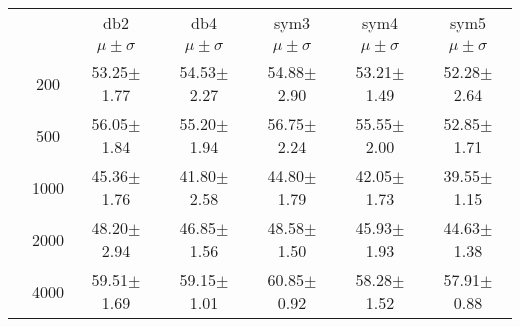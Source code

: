 \begin{table}[H]
\begin{tabular}{|c|c|c c c c c|}
\multicolumn{2}{c|}{}  & db2 & db4 & sym3 & sym4 & sym5 \\\cline{3-7}
\multicolumn{2}{c|}{}& $\mu \pm \sigma$ & $\mu \pm \sigma$ & $\mu \pm \sigma$ & $\mu \pm \sigma$ & $\mu \pm \sigma$ \\\hline

\multicolumn{1}{|c|}{ \multirow{5}{*}{\rotatebox[origin=c]{90}{\textbf{Neurônios}}} }
&200	&53.25$\pm$1.77	&54.53$\pm$2.27	&54.88$\pm$2.90	&53.21$\pm$1.49	&52.28$\pm$2.64\\\cline{2-7}
&500	&56.05$\pm$1.84	&55.20$\pm$1.94	&56.75$\pm$2.24	&55.55$\pm$2.00	&52.85$\pm$1.71\\\cline{2-7}
&1000	&45.36$\pm$1.76	&41.80$\pm$2.58	&44.80$\pm$1.79	&42.05$\pm$1.73	&39.55$\pm$1.15\\\cline{2-7}
&2000	&48.20$\pm$2.94	&46.85$\pm$1.56	&48.58$\pm$1.50	&45.93$\pm$1.93 &44.63$\pm$1.38\\\cline{2-7}
&4000	&59.51$\pm$1.69	&59.15$\pm$1.01	&60.85$\pm$0.92	&58.28$\pm$1.52	&57.91$\pm$0.88
	

\\\midrule
	\end{tabular}

\end{table} %


